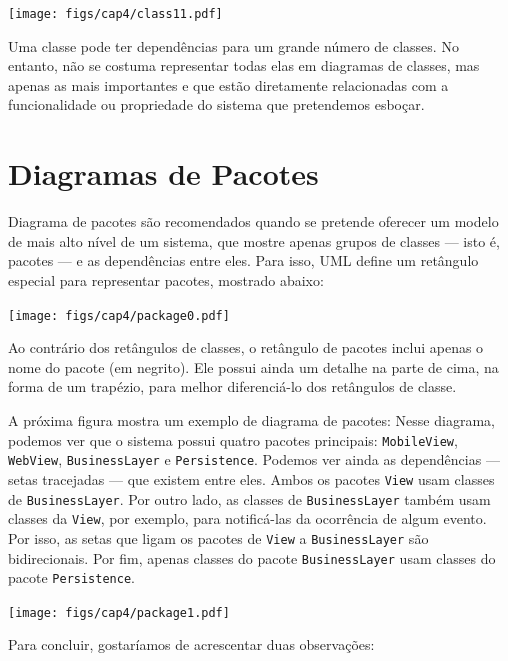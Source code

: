 \documentclass[
  11pt,
  twoside]{book}
\newcommand{\passthrough}[1]{#1}
\begin{document}
\texttt{[image: figs/cap4/class11.pdf]}

Uma classe pode ter dependências para um grande número de classes. No
entanto, não se costuma representar todas elas em diagramas de classes,
mas apenas as mais importantes e que estão diretamente relacionadas com
a funcionalidade ou propriedade do sistema que pretendemos esboçar.

\hypertarget{diagramas-de-pacotes}{%
\section{Diagramas de Pacotes}\label{diagramas-de-pacotes}}

 

Diagrama de pacotes são recomendados quando se pretende oferecer um
modelo de mais alto nível de um sistema, que mostre apenas grupos de
classes --- isto é, pacotes --- e as dependências entre eles. Para isso,
UML define um retângulo especial para representar pacotes, mostrado
abaixo:

\texttt{[image: figs/cap4/package0.pdf]}

Ao contrário dos retângulos de classes, o retângulo de pacotes inclui
apenas o nome do pacote (em negrito). Ele possui ainda um detalhe na
parte de cima, na forma de um trapézio, para melhor diferenciá-lo dos
retângulos de classe.

A próxima figura mostra um exemplo de diagrama de pacotes: Nesse
diagrama, podemos ver que o sistema possui quatro pacotes principais:
\passthrough{\lstinline!MobileView!}, \passthrough{\lstinline!WebView!},
\passthrough{\lstinline!BusinessLayer!} e
\passthrough{\lstinline!Persistence!}. Podemos ver ainda as dependências
--- setas tracejadas --- que existem entre eles. Ambos os pacotes
\passthrough{\lstinline!View!} usam classes de
\passthrough{\lstinline!BusinessLayer!}. Por outro lado, as classes de
\passthrough{\lstinline!BusinessLayer!} também usam classes da
\passthrough{\lstinline!View!}, por exemplo, para notificá-las da
ocorrência de algum evento. Por isso, as setas que ligam os pacotes de
\passthrough{\lstinline!View!} a \passthrough{\lstinline!BusinessLayer!}
são bidirecionais. Por fim, apenas classes do pacote
\passthrough{\lstinline!BusinessLayer!} usam classes do pacote
\passthrough{\lstinline!Persistence!}.

\texttt{[image: figs/cap4/package1.pdf]}

Para concluir, gostaríamos de acrescentar duas observações:
\end{document}
